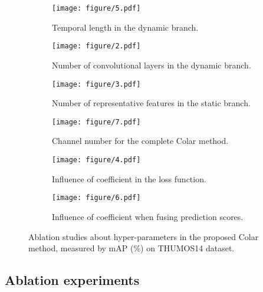 \documentclass[10pt,twocolumn,letterpaper]{article}
\begin{document}
\begin{figure}[thbp]
     \centering
     \begin{subfigure}[b]{0.22\textwidth}
         \centering
         \texttt{[image: figure/5.pdf]}
         \caption{\footnotesize Temporal length  in the dynamic branch.}
         \label{figAblTemLength}
     \end{subfigure}
     \begin{subfigure}[b]{0.22\textwidth}
         \centering
         \texttt{[image: figure/2.pdf]}
         \caption{\footnotesize Number of convolutional layers in the dynamic branch.}
         \label{figAblConLayNum}
     \end{subfigure}
     \begin{subfigure}[b]{0.22\textwidth}
         \centering
         \texttt{[image: figure/3.pdf]}
         \caption{\footnotesize Number of representative features in the static branch.}
         \label{figAblFeatNum}
     \end{subfigure}
     \begin{subfigure}[b]{0.22\textwidth}
         \centering
         \texttt{[image: figure/7.pdf]}
         \caption{\footnotesize Channel number for the complete Colar method.}
         \label{figAblF}
     \end{subfigure}
     \begin{subfigure}[b]{0.22\textwidth}
         \centering
         \texttt{[image: figure/4.pdf]}
         \caption{\footnotesize Influence of coefficient  in the loss function.}
         \label{figAblChannel}
     \end{subfigure}
     \begin{subfigure}[b]{0.22\textwidth}
         \centering
         \texttt{[image: figure/6.pdf]}
         \caption{\footnotesize Influence of coefficient  when fusing prediction scores.}
         \label{figAblSmt}
     \end{subfigure}
        \caption{Ablation studies about hyper-parameters in the proposed Colar method, measured by mAP (\%) on THUMOS14 dataset.}
        \label{figAblation}
    \vspace{-0.3cm}
\end{figure}


\subsection{Ablation experiments}
\end{document}

